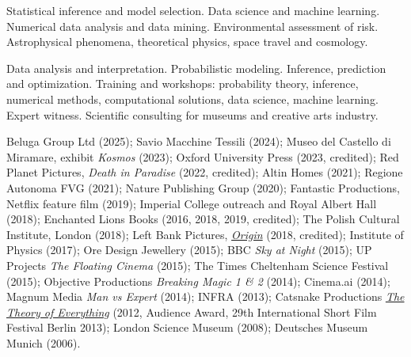 


 Statistical inference and model selection. Data science and machine learning. Numerical data analysis and data mining. Environmental assessment of risk. Astrophysical phenomena, theoretical physics, space travel and cosmology.

 Data analysis and interpretation. Probabilistic modeling. Inference, prediction and optimization. Training and workshops: probability theory, inference, numerical methods, computational solutions, data science, machine learning. Expert witness. Scientific consulting for museums and creative arts industry.

 Beluga Group Ltd (2025); Savio Macchine Tessili (2024); Museo del Castello di Miramare, exhibit {\em Kosmos} (2023); Oxford University Press (2023, credited); Red Planet Pictures, {\em Death in Paradise} (2022, credited); Altin Homes (2021); Regione Autonoma FVG (2021); Nature Publishing Group (2020); Fantastic Productions, Netflix feature film (2019); Imperial College outreach and Royal Albert Hall (2018);  Enchanted Lions Books (2016, 2018, 2019, credited); The Polish Cultural Institute, London (2018); Left Bank Pictures, \href{https://www.youtube.com/watch?v=Povj1x_vmEs}{\em Origin} (2018, credited); Institute of Physics (2017); Ore Design Jewellery (2015); BBC {\em Sky at Night} (2015); UP Projects {\em The Floating Cinema} (2015); The Times Cheltenham Science Festival (2015); Objective Productions {\em Breaking Magic 1 \& 2} (2014); Cinema.ai (2014); Magnum Media {\em Man vs Expert} (2014); INFRA (2013); Catsnake Productions \href{https://www.youtube.com/watch?v=N4ysAHWugO8}{\em The Theory of Everything} (2012, Audience Award, 29th International Short Film Festival Berlin 2013); London Science Museum (2008); Deutsches Museum Munich (2006).

